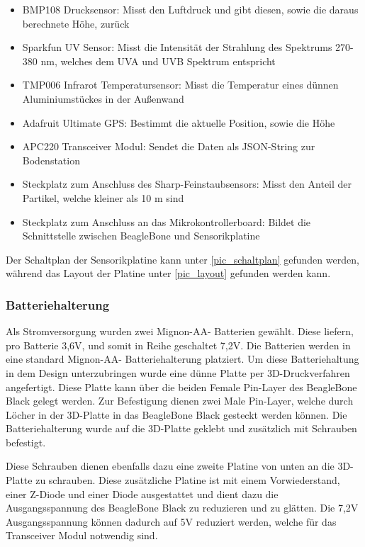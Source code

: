 \begin{itemize}
	\item BMP108 Drucksensor: Misst den Luftdruck und gibt diesen, sowie die daraus berechnete Höhe, zurück
	\item Sparkfun UV Sensor: Misst die Intensität der Strahlung des Spektrums 270-380 nm, welches dem UVA und UVB Spektrum entspricht
	\item TMP006 Infrarot Temperatursensor: Misst die Temperatur eines dünnen Aluminiumstückes in der Außenwand 
	\item Adafruit Ultimate GPS: Bestimmt die aktuelle Position, sowie die Höhe
	\item APC220 Transceiver Modul: Sendet die Daten als JSON-String zur Bodenstation
	\item Steckplatz zum Anschluss des Sharp-Feinstaubsensors: Misst den Anteil der Partikel, welche kleiner als 10 \textmu m sind
	\item Steckplatz zum Anschluss an das Mikrokontrollerboard: Bildet die Schnittstelle zwischen BeagleBone und Sensorikplatine
\end{itemize}

Der Schaltplan der Sensorikplatine kann unter \ref{pic_schaltplan} gefunden werden, während das Layout der Platine unter \ref{pic_layout} gefunden werden kann.

\subsubsection{Batteriehalterung}
Als Stromversorgung wurden zwei Mignon-AA- Batterien gewählt. Diese liefern, pro Batterie 3,6V, und somit in Reihe geschaltet 7,2V. Die Batterien werden in eine standard Mignon-AA- Batteriehalterung platziert. Um diese Batteriehaltung in dem Design unterzubringen wurde eine dünne Platte per 3D-Druckverfahren angefertigt. Diese Platte kann über die beiden Female Pin-Layer des BeagleBone Black gelegt werden. Zur Befestigung dienen zwei Male Pin-Layer, welche durch Löcher in der 3D-Platte in das BeagleBone Black gesteckt werden können. Die Batteriehalterung wurde auf die 3D-Platte geklebt und zusätzlich mit Schrauben befestigt.

Diese Schrauben dienen ebenfalls dazu eine zweite Platine von unten an die 3D-Platte zu schrauben. Diese zusätzliche Platine ist mit einem Vorwiederstand, einer Z-Diode und einer Diode ausgestattet und dient dazu die Ausgangsspannung des BeagleBone Black zu reduzieren und zu glätten. Die 7,2V Ausgangsspannung können dadurch auf 5V reduziert werden, welche für das Transceiver Modul notwendig sind.